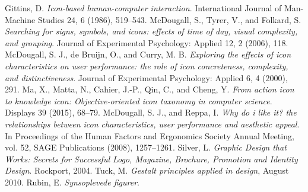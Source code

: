 \documentclass[12pt,a4paper]{article}
\begin{document}
\begin{thebibliography}{20}
 Gittins, D. \textit{Icon-based human-computer interaction}. International Journal of Man-Machine Studies 24, 6 (1986), 519–543.
 McDougall, S., Tyrer, V., and Folkard, S. \textit{Searching for signs, symbols, and icons: effects of time of day, visual complexity, and grouping}. Journal of Experimental Psychology: Applied 12, 2 (2006), 118.
 McDougall, S. J., de Bruijn, O., and Curry, M. B. \textit{Exploring the effects of icon characteristics on user performance: the role of icon concreteness, complexity, and distinctiveness}. Journal of Experimental Psychology: Applied 6, 4 (2000), 291.
 Ma, X., Matta, N., Cahier, J.-P., Qin, C., and Cheng, Y. \textit{From action icon to knowledge icon: Objective-oriented icon taxonomy in computer science}. Displays 39 (2015), 68–79.
 McDougall, S. J., and Reppa, I. \textit{Why do i like it? the relationships between icon characteristics, user performance and aesthetic appeal}. In Proceedings of the Human Factors and Ergonomics Society Annual Meeting, vol. 52, SAGE Publications (2008), 1257–1261.
 Silver, L. \textit{Graphic Design that Works: Secrets for Successful Logo, Magazine, Brochure, Promotion and Identity Design}. Rockport, 2004.
 Tuck, M. \textit{Gestalt principles applied in design}, August 2010.
 Rubin, E. \textit{Synsoplevede figurer}.
\end{thebibliography}
\end{document}
